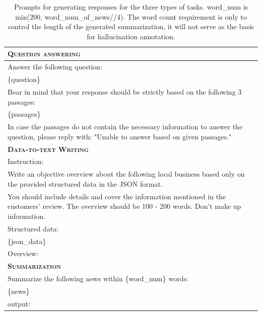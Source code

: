 \documentclass[11pt]{article}
\begin{document}
\begin{table}[!ht]

\renewcommand{\arraystretch}{1.1}

\small
\centering
    \begin{tabular}{p{}}
    \toprule

    \textbf{\textsc{Question answering}}\\
    \midrule
    Answer the following question:\\
    \{question\}\\
    Bear in mind that your response should be strictly based on the following 3 passages:\\
    \{passages\}\\
    In case the passages do not contain the necessary information to answer the question, please reply with: "Unable to answer based on given passages."\\
    \midrule
    \textbf{\textsc{Data-to-text Writing}}\\
    \midrule
    Instruction:\\
    Write an objective overview about the following local business based only on the provided structured data in the JSON format.\\
    You should include details and cover the information mentioned in the customers' review. The overview should be 100 - 200 words. Don't make up information.\\
    Structured data:\\
    \{json\_data\}\\
    Overview:\\
    \midrule
    \textbf{\textsc{Summarization}}\\
    \midrule
    Summarize the following news within \{word\_num\} words:\\
    \{news\}\\
    output:\\
    \bottomrule
    \end{tabular}
    \caption{Prompts for generating responses for the three types of tasks. word\_num is min(200, word\_num\_of\_news//4). The word count requirement is only to control the length of the generated summarization, it will not serve as the basis for hallucination annotation.} 
    \label{tab:prompts}
\end{table}


\clearpage
\end{document}
